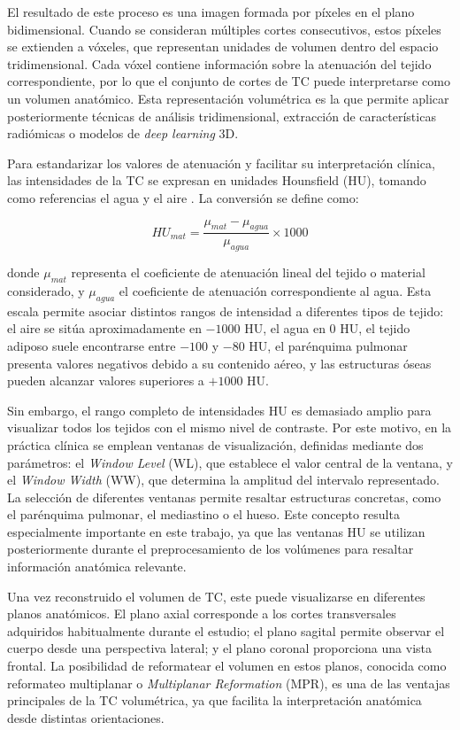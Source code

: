 El resultado de este proceso es una imagen formada por píxeles en el plano bidimensional. Cuando se consideran múltiples cortes consecutivos, estos píxeles se extienden a vóxeles, que representan unidades de volumen dentro del espacio tridimensional. Cada vóxel contiene información sobre la atenuación del tejido correspondiente, por lo que el conjunto de cortes de TC puede interpretarse como un volumen anatómico. Esta representación volumétrica es la que permite aplicar posteriormente técnicas de análisis tridimensional, extracción de características radiómicas o modelos de \textit{deep learning} 3D.

Para estandarizar los valores de atenuación y facilitar su interpretación clínica, las intensidades de la TC se expresan en unidades Hounsfield (HU), tomando como referencias el agua y el aire \cite{calzado2010tomografia}. La conversión se define como:

\[
HU_{mat} = \frac{\mu_{mat} - \mu_{agua}}{\mu_{agua}} \times 1000
\]

donde $\mu_{mat}$ representa el coeficiente de atenuación lineal del tejido o material considerado, y $\mu_{agua}$ el coeficiente de atenuación correspondiente al agua. Esta escala permite asociar distintos rangos de intensidad a diferentes tipos de tejido: el aire se sitúa aproximadamente en $-1000$ HU, el agua en 0 HU, el tejido adiposo suele encontrarse entre $-100$ y $-80$ HU, el parénquima pulmonar presenta valores negativos debido a su contenido aéreo, y las estructuras óseas pueden alcanzar valores superiores a $+1000$ HU.

Sin embargo, el rango completo de intensidades HU es demasiado amplio para visualizar todos los tejidos con el mismo nivel de contraste. Por este motivo, en la práctica clínica se emplean ventanas de visualización, definidas mediante dos parámetros: el \textit{Window Level} (WL), que establece el valor central de la ventana, y el \textit{Window Width} (WW), que determina la amplitud del intervalo representado. La selección de diferentes ventanas permite resaltar estructuras concretas, como el parénquima pulmonar, el mediastino o el hueso. Este concepto resulta especialmente importante en este trabajo, ya que las ventanas HU se utilizan posteriormente durante el preprocesamiento de los volúmenes para resaltar información anatómica relevante.

Una vez reconstruido el volumen de TC, este puede visualizarse en diferentes planos anatómicos. El plano axial corresponde a los cortes transversales adquiridos habitualmente durante el estudio; el plano sagital permite observar el cuerpo desde una perspectiva lateral; y el plano coronal proporciona una vista frontal. La posibilidad de reformatear el volumen en estos planos, conocida como reformateo multiplanar o \textit{Multiplanar Reformation} (MPR), es una de las ventajas principales de la TC volumétrica, ya que facilita la interpretación anatómica desde distintas orientaciones.

